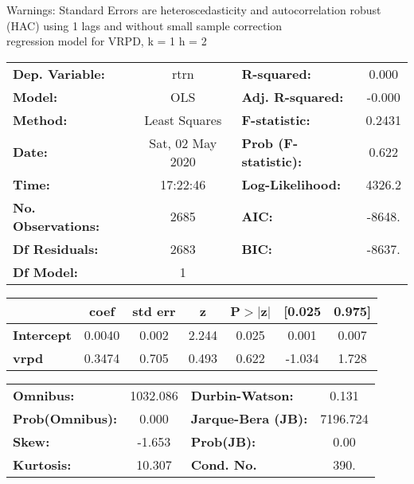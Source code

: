 Warnings: \newline
 [1] Standard Errors are heteroscedasticity and autocorrelation robust (HAC) using 1 lags and without small sample correction\\ 

regression model for VRPD, k = 1 h = 2\begin{center}
\begin{tabular}{lclc}
\toprule
\textbf{Dep. Variable:}    &       rtrn       & \textbf{  R-squared:         } &     0.000   \\
\textbf{Model:}            &       OLS        & \textbf{  Adj. R-squared:    } &    -0.000   \\
\textbf{Method:}           &  Least Squares   & \textbf{  F-statistic:       } &    0.2431   \\
\textbf{Date:}             & Sat, 02 May 2020 & \textbf{  Prob (F-statistic):} &    0.622    \\
\textbf{Time:}             &     17:22:46     & \textbf{  Log-Likelihood:    } &    4326.2   \\
\textbf{No. Observations:} &        2685      & \textbf{  AIC:               } &    -8648.   \\
\textbf{Df Residuals:}     &        2683      & \textbf{  BIC:               } &    -8637.   \\
\textbf{Df Model:}         &           1      & \textbf{                     } &             \\
\bottomrule
\end{tabular}
\begin{tabular}{lcccccc}
                   & \textbf{coef} & \textbf{std err} & \textbf{z} & \textbf{P$> |$z$|$} & \textbf{[0.025} & \textbf{0.975]}  \\
\midrule
\textbf{Intercept} &       0.0040  &        0.002     &     2.244  &         0.025        &        0.001    &        0.007     \\
\textbf{vrpd}      &       0.3474  &        0.705     &     0.493  &         0.622        &       -1.034    &        1.728     \\
\bottomrule
\end{tabular}
\begin{tabular}{lclc}
\textbf{Omnibus:}       & 1032.086 & \textbf{  Durbin-Watson:     } &    0.131  \\
\textbf{Prob(Omnibus):} &   0.000  & \textbf{  Jarque-Bera (JB):  } & 7196.724  \\
\textbf{Skew:}          &  -1.653  & \textbf{  Prob(JB):          } &     0.00  \\
\textbf{Kurtosis:}      &  10.307  & \textbf{  Cond. No.          } &     390.  \\
\bottomrule
\end{tabular}
\end{center}

